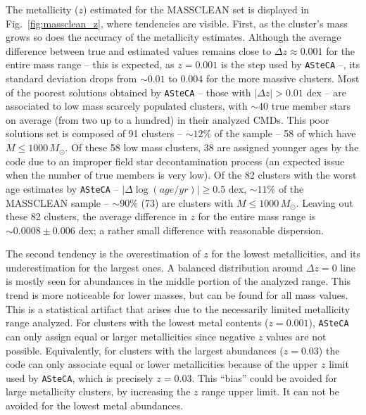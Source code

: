 \documentclass[draft]{aa}
\begin{document}
\begin{appendix}
The metallicity ($z$) estimated for the MASSCLEAN set is displayed in
Fig.~\ref{fig:massclean_z}, where tendencies are visible.
%
First, as the cluster's mass grows so does the accuracy of the
metallicity estimates. Although the average difference between true and
estimated values remains close to $\overline{\Delta z}{\approx}0.001$ for the
entire mass range -- this is expected, as $z{=}0.001$ is the step used by
\texttt{ASteCA} --, its standard deviation drops from ${\sim}0.01$ to $0.004$
for the more massive clusters.
%
%
Most of the poorest solutions obtained by \texttt{ASteCA} -- those with
$|\Delta z|{>}0.01$ dex -- are associated to low mass scarcely populated
clusters, with ${\sim}40$ true member stars on average (from two up to a
hundred) in their analyzed CMDs. This poor solutions set is composed of 91
clusters -- ${\sim}12\%$ of the sample -- 58 of which have
$M{\le}1000\,M_{\odot}$.
%
Of these 58 low mass clusters, 38 are assigned younger ages by the code due to
an improper field star decontamination process (an expected issue when the
number of true members is very low).
%
Of the 82 clusters with the worst age estimates by \texttt{ASteCA} --
$|\Delta\log(age/yr)|{\ge}0.5$ dex, ${\sim}11\%$ of the MASSCLEAN sample --
${\sim}90\%$ (73) are clusters with $M{\le}1000\,M_{\odot}$.
%
Leaving out these 82 clusters, the average difference in $z$
for the entire mass range is ${\sim}0.0008{\pm}0.006$ dex; a rather
small difference with reasonable dispersion.

The second tendency is the overestimation of $z$ for the lowest metallicities,
and its underestimation for the largest ones.
A balanced distribution around $\Delta z{=}0$ line is mostly seen for
abundances in the middle portion of the analyzed range. This trend is more
noticeable for lower masses, but can be found for all mass values.
%
This is a statistical artifact that arises due to the necessarily limited
metallicity range analyzed. For clusters with the lowest metal contents ($z
{=}0.001$), \texttt{ASteCA} can only assign equal or larger metallicities since
negative $z$ values are not possible.
Equivalently, for clusters with the largest abundances ($z{=}0.03$) the code
can only associate equal or lower metallicities because of the upper
$z$ limit used by \texttt{ASteCA}, which is precisely $z{=}0.03$.
This ``bias'' could be avoided for large metallicity clusters, by
increasing the $z$ range upper limit. It can not be avoided for the lowest metal
abundances.\\


\end{appendix}
\end{document}
